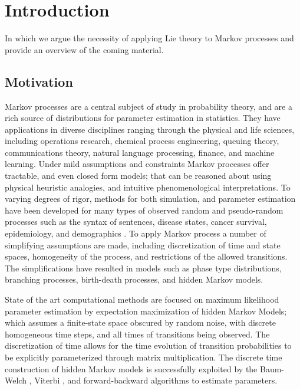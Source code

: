 \chapter{Introduction}
In which we argue the necessity of applying Lie theory to Markov processes and provide an
overview of the coming material.
\section{Motivation}
Markov processes are a central subject of study in probability theory, and are a rich source
of distributions for parameter estimation in statistics\cite{billingsley_probability_1995,rogers_diffusions_2000,rogers_diffusions_2000-1}.
They have applications in diverse disciplines ranging through the physical and life
sciences, including operations research, chemical process engineering, queuing theory,
communications theory, natural language processing, finance, and machine learning. Under
mild assumptions and constraints Markov processes offer tractable, and even closed form 
models; that can be reasoned about using physical heuristic analogies, and intuitive
phenomenological interpretations. To varying degrees of rigor, methods for both simulation,
and parameter estimation have been developed for many types of observed random and
pseudo-random processes such as the syntax of sentences, disease states, cancer survival,
epidemiology, and demographics \cite{government_of_canada_modgen_2009}. To apply Markov 
process a number of simplifying assumptions are made, including discretization of time and 
state spaces, homogeneity of the process, and restrictions of the allowed transitions. The 
simplifications have resulted in models such as phase type distributions, branching 
processes, birth-death processes, and hidden Markov models.

State of the art computational methods are focused on maximum likelihood parameter
estimation by expectation maximization of hidden Markov Models; which assumes a finite-state
space obscured by random noise, with discrete homogeneous time steps, and all times of
transitions being observed. The discretization of time allows for the time evolution of
transition probabilities to be explicitly parameterized through matrix multiplication. The
discrete time construction of hidden Markov models is successfully exploited by the
Baum-Welch \cite{baum_maximization_1970,baum_statistical_1966}, Viterbi \cite{viterbi_error_1967}, 
and forward-backward algorithms to estimate parameters.

